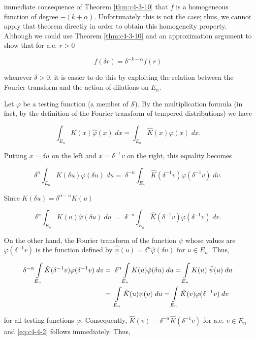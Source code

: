 immediate consequence of Theorem \ref{thm:c4-3-10} that $f$ is a homogeneous function of degree $-(k+\alpha)$. Unfortunately this is not the case; thus, we cannot apply that theorem directly in order to obtain this homogeneity property. Although we could use Theorem \ref{thm:c4-3-10} and an approximation argument to show that for a.e. $r>0$

\begin{equation}\label{eq:c4-4-2}
f(\delta r)=\delta^{-k-\alpha}f(r)
\end{equation}

whenever $\delta > 0$, it is easier to do this by exploiting the relation between the Fourier transform and the action of dilations on $E_n$.

Let $\varphi$ be a testing function (a member of $\mathcal{S}$). By the multiplication formula (in fact, by the definition of the Fourier transform of tempered distributions) we have

\[
\int_{E_{n}}K(x)\hat{\varphi}(x)\;d x=\int_{E_{n}}\hat{K}(x)\varphi(x)\;d x.
\]

Putting $x = \delta u$ on the left and $x = \delta^{-1}v$ on the right, this equality becomes

\[
\delta^{n}\int_{E_{n}}K(\delta u)\hat{\varphi}(\delta u)\;d u=\;\delta^{-n}\int_{E_{n}}\hat{K}(\delta^{-1}v)\varphi(\delta^{-1}v)\;d v.
\]

Since $K(\delta u) = \delta^{\alpha-n}K(u)$

\[
\delta^{\alpha}\int_{E_{n}}K(u)\hat{\varphi}(\delta u)\;d u\;=\;\delta^{-n}\int_{E_{n}}\hat{K}(\delta^{-1}v)\varphi(\delta^{-1}v)\;d v.
\]

On the other hand, the Fourier transform of the function $\psi$ whose values are $\varphi(\delta^{-1}v)$ is the function defined by $\hat{\psi}(u) = \delta^n \hat{\varphi}(\delta u)$ for $u \in E_n$. Thus,

\[
\begin{aligned}{\delta^{-\alpha}\intop_{E_{n}}\hat{K}(\delta^{-1}v)\varphi(\delta^{-1}v)\;d v}&{{}=\;\delta^{n}\intop_{E_{n}}K(u)\hat{\varphi}(\delta u)\;d u=\intop_{E_{n}}K(u)\;\hat{\psi}(u)\;d u}\\ {}&{{}=\;\intop_{E_{n}}\hat{K}(u)\psi(u)\;d u=\intop_{E_{n}}\hat{K}(v)\varphi(\delta^{-1}v)\;d v}\\ \end{aligned}
\]

for all testing functions $\varphi$. Consequently, $\hat{K}(v) = \delta^{-\alpha}\hat{K}(\delta^{-1}v)$ for a.e. $v \in E_n$ and \eqref{eq:c4-4-2} follows immediately. Thus,

